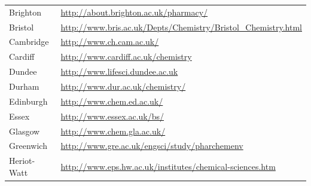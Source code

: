 \begin{table}[H]
\begin{tabular}{||p{2.5cm}|Y||}
 \footnotesize{Brighton                }           & \footnotesize{\url{http://about.brighton.ac.uk/pharmacy/}}                                                                                                \\
 \footnotesize{Bristol                }            & \footnotesize{\url{http://www.bris.ac.uk/Depts/Chemistry/Bristol\_Chemistry.html}}                                                                         \\
 \footnotesize{Cambridge             }             & \footnotesize{\url{http://www.ch.cam.ac.uk/}}                                                                                                             \\
 \footnotesize{Cardiff              }              & \footnotesize{\url{http://www.cardiff.ac.uk/chemistry}}                                                                                                   \\
 \footnotesize{Dundee              }               & \footnotesize{\url{http://www.lifesci.dundee.ac.uk}}                                                                                                      \\
 \footnotesize{Durham             }                & \footnotesize{\url{http://www.dur.ac.uk/chemistry/}}                                                                                                      \\
 \footnotesize{Edinburgh         }                 & \footnotesize{\url{http://www.chem.ed.ac.uk/}}                                                                                                            \\
 \footnotesize{Essex            }                  & \footnotesize{\url{http://www.essex.ac.uk/bs/}                                                                                                          } \\
 \footnotesize{Glasgow         }                   & \footnotesize{\url{http://www.chem.gla.ac.uk/}}                                                                                                           \\
 \footnotesize{Greenwich      }                    & \footnotesize{\url{http://www.gre.ac.uk/engsci/study/pharchemenv}}                                                                                        \\
 \footnotesize{Heriot-Watt   }                     & \footnotesize{\url{http://www.eps.hw.ac.uk/institutes/chemical-sciences.htm}}                                                                             \\

\end{tabular}
\end{table}
